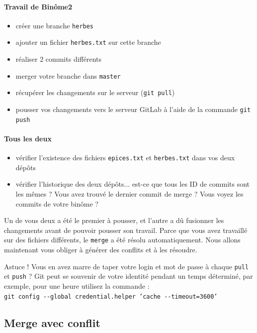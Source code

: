 \documentclass[final, a4paper, openbib, ]{article}
\begin{document}
\paragraph{Travail de Binôme2}
\begin{itemize}
\item créer une branche \texttt{herbes}
\item ajouter un fichier \texttt{herbes.txt} sur cette branche
\item réaliser 2 commits différents
\item merger votre branche dans \texttt{master}
\item récupérer les changements sur le serveur (\texttt{git pull})
\item pousser vos changements vers le serveur GitLab à l'aide de la commande \texttt{git push}\\
\end{itemize}

\paragraph{Tous les deux}
\begin{itemize}
\item vérifier l'existence des fichiers \texttt{epices.txt} et \texttt{herbes.txt} dans vos deux dépôts
\item vérifier l'historique des deux dépôts... est-ce que tous les ID de commits sont les mêmes ? Vous avez trouvé le dernier commit de merge ? Vous voyez les commits de votre binôme ?\\
\end{itemize}

Un de vous deux a été le premier à pousser, et l'autre a dû fusionner les changements avant de pouvoir pousser son travail.
Parce que vous avez travaillé sur des fichiers différents, le \texttt{merge} a été résolu automatiquement.
Nous allons maintenant vous obliger à générer des conflits et à les résoudre.

\begin{alertinfo3}{Astuce !}
Vous en avez marre de taper votre login et mot de passe à chaque \texttt{pull} et \texttt{push} ?
Git peut se souvenir de votre identité pendant un temps déterminé, par exemple, pour une heure utilisez la commande :\\
\texttt{git config -{}-global credential.helper 'cache -{}-timeout=3600'}
\end{alertinfo3}


\subsection{Merge avec conflit}
\end{document}
